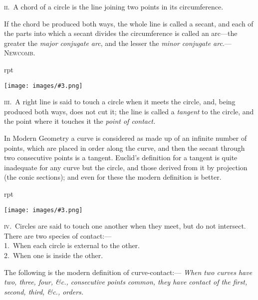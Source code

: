 \documentclass[oneside]{book}
\newcounter{wrapwidth}
\newcommand\imgflow[3]{
\setcounter{wrapwidth}{#1}
\begin{wrapfigure}[#2]{r}{\value{wrapwidth}pt}
\begin{center}
\vspace{-0.3in}
\texttt{[image: images/\#3.png]}
\end{center}
\end{wrapfigure}
}
\begin{document}
\textsc{ii}.\ A chord of a circle is the line joining two points
in its circumference.\par\medskip

\begin{footnotesize}
If the chord be produced both ways, the whole line is called a
secant, and each of the parts into which a secant divides the circumference
is called an arc---the greater the \emph{major conjugate arc},
and the lesser the \emph{minor conjugate arc}.---\textsc{Newcomb}.
\par\end{footnotesize}\medskip

\imgflow{126}{10}{f100}

\textsc{iii}.\ A right line is said to
touch a circle when it meets
the circle, and, being produced
both ways, does not cut it;
the line is called a \emph{tangent}
to the circle, and the point
where it touches it the \emph{point
of contact.}\par\medskip

\begin{footnotesize}
In Modern Geometry a curve is considered as made up of an
infinite number of points, which are placed in order along the
curve, and then the secant through two consecutive points is a
tangent. Euclid's definition for a tangent is quite inadequate for
any curve but the circle, and those derived from it by projection
(the conic sections); and even for these the modern definition is
better.
\par\end{footnotesize}\medskip

\imgflow{160}{9}{f101}

\textsc{iv}.\ Circles are said to
touch one another when
they meet, but do not
intersect. There are two
species of contact:---\\
1.~When each circle is
external to the other.\\
2.~When one is inside
the other.\par\smallskip

\begin{footnotesize}
The following is the modern definition of curve-contact:---
\emph{When two curves have two, three, four, \&c., consecutive points
common, they have contact of the first, second, third, \&c., orders.}
\par\end{footnotesize}\smallskip
\end{document}
